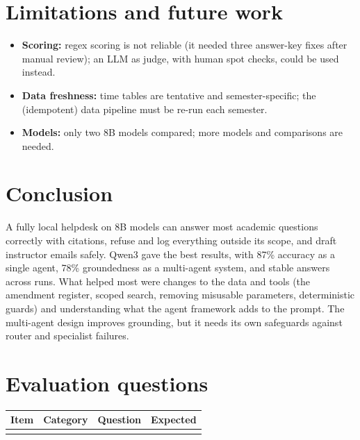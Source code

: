 \documentclass[10pt,a4paper]{article}
\begin{document}
\section{Limitations and future work}
\begin{itemize}
\item \textbf{Scoring:} regex scoring is not reliable (it needed three answer-key fixes after manual review); an LLM
  as judge, with human spot checks, could be used instead.
\item \textbf{Data freshness:} time tables are tentative and semester-specific; the (idempotent) data pipeline must
  be re-run each semester.
\item \textbf{Models:} only two 8B models compared; more models and comparisons are needed.
\end{itemize}

\section{Conclusion}
A fully local helpdesk on 8B models can answer most academic questions correctly with citations, refuse and log
everything outside its scope, and draft instructor emails safely. Qwen3 gave the best results, with 87\% accuracy as
a single agent, 78\% groundedness as a multi-agent system, and stable answers across runs. What helped most were
changes to the data and tools (the amendment register, scoped search, removing misusable parameters, deterministic
guards) and understanding what the agent framework adds to the prompt. The multi-agent design improves grounding,
but it needs its own safeguards against router and specialist failures.

\appendix
\section{Evaluation questions}\label{app:questions}
{\small
\begin{longtable}{l l p{5.6cm} p{6.3cm}}
\toprule
Item & Category & Question & Expected \\
\midrule
\endhead
{}{tables/questions.tex}
\bottomrule
\end{longtable}}
\end{document}
